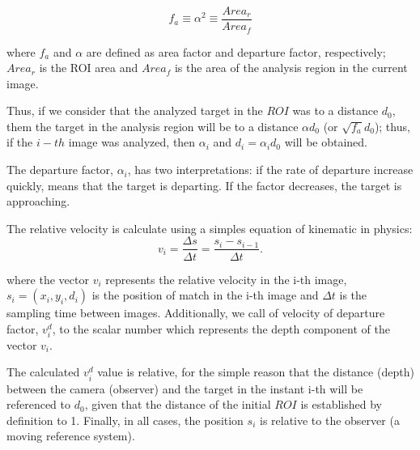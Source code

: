 \begin{equation}\label{eq:relarea}
f_a \equiv \alpha^2 \equiv \frac{Area_r}{Area_f} 
\end{equation}

where $f_a$ and $\alpha$ are defined as area factor and departure factor, 
respectively; $Area_r$ is the ROI area and $Area_f$ 
is the area of the analysis region in the current image. 

Thus, if we consider that the analyzed target  in the $ROI$ was to a distance $d_0$,
them the target in the analysis region will be to a distance $\alpha d_0$ (or $\sqrt{f_a} d_0$);
thus, if the $i-th$ image was analyzed, then $\alpha_i$ and $d_i=\alpha_i d_0$ will be obtained.

The departure factor, $\alpha_i$, has two interpretations: if the rate of departure increase quickly, 
means that the target is departing. If the factor decreases, the 
target is approaching.

The relative velocity is calculate using a simples equation of kinematic in physics:
\begin{equation}
 v_i = \frac{\Delta s}{\Delta t}= \frac{s_i-s_{i-1}}{\Delta t}.
\end{equation}

where the vector $v_i$ represents the relative velocity in the i-th image, 
$s_i=(x_i,y_i,d_i)$ is the position of match in the i-th image
and $\Delta t$ is the sampling time between images.
Additionally, we call of velocity of departure factor, $v^d_i$, to 
the scalar number which represents the depth component
of the vector $v_i$.

The calculated  $v^d_i$ value is relative, for the simple reason that the distance (depth) between the 
camera (observer) and the target in the instant i-th will be referenced to $d_0$, 
given that the distance of the initial $ROI$ is established by definition to 1.
Finally, in all cases, the position $s_i$ is relative to the observer (a moving reference system).

